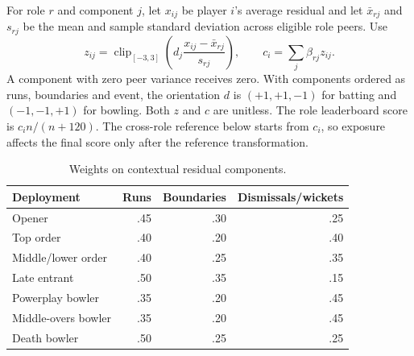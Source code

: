 \documentclass[12pt,a4paper]{article}
\begin{document}
For role $r$ and component $j$, let $x_{ij}$ be player $i$'s average residual and let $\bar x_{rj}$ and $s_{rj}$ be the mean and sample standard deviation across eligible role peers. Use
\begin{equation}
z_{ij}=\operatorname{clip}_{[-3,3]}
\left(d_j\frac{x_{ij}-\bar{x}_{rj}}{s_{rj}}\right),\qquad
c_i=\sum_j\beta_{rj}z_{ij}.
\end{equation}
A component with zero peer variance receives zero. With components ordered as runs, boundaries and event, the orientation $d$ is $(+1,+1,-1)$ for batting and $(-1,-1,+1)$ for bowling. Both $z$ and $c$ are unitless. The role leaderboard score is $c_i n/(n+120)$. The cross-role reference below starts from $c_i$, so exposure affects the final score only after the reference transformation.
\begin{table}[ht]
\centering
\caption{Weights on contextual residual components.}
\begin{tabular}{lrrr}
\toprule Deployment & Runs & Boundaries & Dismissals/wickets \\
\midrule
Opener & .45 & .30 & .25 \\
Top order & .40 & .20 & .40 \\
Middle/lower order & .40 & .25 & .35 \\
Late entrant & .50 & .35 & .15 \\
Powerplay bowler & .35 & .20 & .45 \\
Middle-overs bowler & .35 & .20 & .45 \\
Death bowler & .50 & .25 & .25 \\
\bottomrule
\end{tabular}
\end{table}
\end{document}

